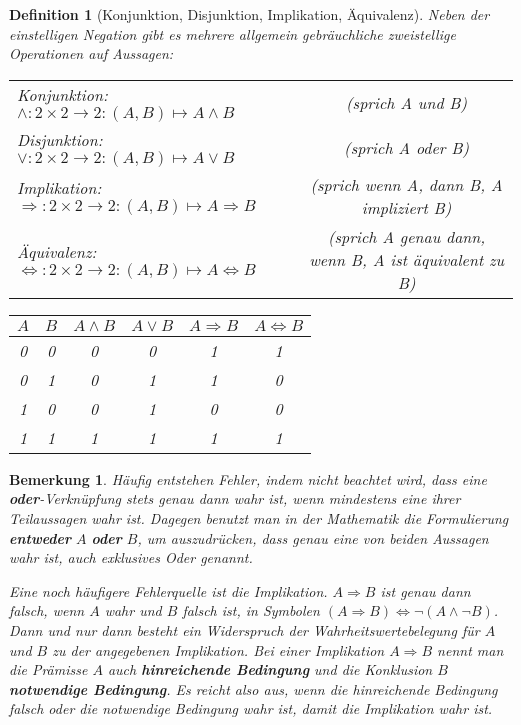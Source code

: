 \documentclass[a4paper]{article}
\newtheorem{bemerkung}[satz]{Bemerkung}
\newtheorem{definition}[satz]{Definition} %
\theoremstyle{nonumberplain}
\begin{document}
\begin{definition}[Konjunktion, Disjunktion, Implikation, Äquivalenz] Neben der einstelligen Negation gibt es mehrere allgemein gebräuchliche zweistellige Operationen auf Aussagen:

\begin{center}
\begin{tabular}{lc}
	Konjunktion: $\land : 2 \times 2 \to 2 : (A,B) \mapsto A \land B$ &
		(sprich \glqq A und B\grqq )\\
	Disjunktion: $\lor : 2 \times 2 \to 2 : (A,B) \mapsto A \lor B$ &
		(sprich \glqq A oder B\grqq )\\
	Implikation: $\Rightarrow : 2 \times 2 \to 2 : (A,B) \mapsto A \Rightarrow B$ &
		(sprich \glqq wenn A, dann B\grqq , \glqq A impliziert B\grqq )\\
	Äquivalenz: $\Leftrightarrow : 2 \times 2 \to 2 : (A,B) \mapsto A \Leftrightarrow B$ &
		(sprich \glqq A genau dann, wenn B\grqq, \glqq A ist äquivalent zu B\grqq )
\end{tabular}
\end{center}

\begin{center}
\begin{tabular}{|c|c|c|c|c|c|}
	\hline
	$A$ & $B$ & $A\land B$ & $A\lor B$ & $A\Rightarrow B$ & $A\Leftrightarrow B$ \\
	\hline
	0 & 0 & 0 & 0 & 1 & 1 \\
	\hline
	0 & 1 & 0 & 1 & 1 & 0 \\
	\hline
	1 & 0 & 0 & 1 & 0 & 0 \\
	\hline
	1 & 1 & 1 & 1 & 1 & 1 \\
	\hline 
\end{tabular}
\end{center}
\end{definition}
\begin{bemerkung}
Häufig entstehen Fehler, indem nicht beachtet wird, dass eine \textbf{oder}-Verknüpfung stets genau dann wahr ist, wenn \textit{mindestens eine} ihrer Teilaussagen wahr ist. Dagegen benutzt man in der Mathematik die Formulierung \glqq \textbf{entweder} $A$ \textbf{oder} $B$\grqq , um auszudrücken, dass \textit{genau eine} von beiden Aussagen wahr ist, auch \textit{exklusives Oder} genannt.

Eine noch häufigere Fehlerquelle ist die Implikation. $A\Rightarrow B$ ist genau dann falsch, wenn $A$ wahr und $B$ falsch ist, in Symbolen $(A\Rightarrow B) \Leftrightarrow \neg (A \land \neg B)$. Dann und nur dann besteht ein Widerspruch der Wahrheitswertebelegung für $A$ und $B$ zu der angegebenen Implikation. Bei einer Implikation $A \Rightarrow B$ nennt man die Prämisse $A$ auch \textbf{hinreichende Bedingung} und die Konklusion $B$ \textbf{notwendige Bedingung}. Es reicht also aus, wenn die hinreichende Bedingung falsch oder die notwendige Bedingung wahr ist, damit die Implikation wahr ist.
\end{bemerkung}
\end{document}
